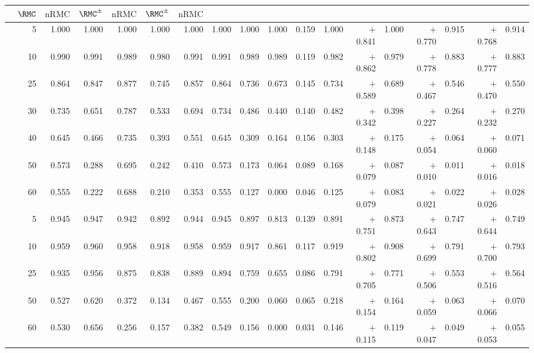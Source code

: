 \begin{table}[ht]
{\begin{tabular}{p{2.2cm}r rrrr rr rr rr rr rr rr}
  & $\RMC$ & $\mathrm{nRMC}$
  & $\RMC^{\pm}$ & $\mathrm{nRMC}$
  & $\RMC^{\pm}$ & $\mathrm{nRMC}$ \\
\midrule
{}
  & 5  & 1.000 & 1.000 & 1.000 & 1.000 & 1.000 & 1.000 & 1.000 & 1.000 & 0.159 & 1.000 & $+$0.841 & 1.000 & $+$0.770 & 0.915 & $+$0.768 & 0.914 \\
  & 10 & 0.990 & 0.991 & 0.989 & 0.980 & 0.991 & 0.991 & 0.989 & 0.989 & 0.119 & 0.982 & $+$0.862 & 0.979 & $+$0.778 & 0.883 & $+$0.777 & 0.883 \\
  & 25 & 0.864 & 0.847 & 0.877 & 0.745 & 0.857 & 0.864 & 0.736 & 0.673 & 0.145 & 0.734 & $+$0.589 & 0.689 & $+$0.467 & 0.546 & $+$0.470 & 0.550 \\
  & 30 & 0.735 & 0.651 & 0.787 & 0.533 & 0.694 & 0.734 & 0.486 & 0.440 & 0.140 & 0.482 & $+$0.342 & 0.398 & $+$0.227 & 0.264 & $+$0.232 & 0.270 \\
  & 40 & 0.645 & 0.466 & 0.735 & 0.393 & 0.551 & 0.645 & 0.309 & 0.164 & 0.156 & 0.303 & $+$0.148 & 0.175 & $+$0.054 & 0.064 & $+$0.060 & 0.071 \\
  & 50 & 0.573 & 0.288 & 0.695 & 0.242 & 0.410 & 0.573 & 0.173 & 0.064 & 0.089 & 0.168 & $+$0.079 & 0.087 & $+$0.010 & 0.011 & $+$0.016 & 0.018 \\
  & 60 & 0.555 & 0.222 & 0.688 & 0.210 & 0.353 & 0.555 & 0.127 & 0.000 & 0.046 & 0.125 & $+$0.079 & 0.083 & $+$0.021 & 0.022 & $+$0.026 & 0.028 \\
\midrule
{}
  & 5  & 0.945 & 0.947 & 0.942 & 0.892 & 0.944 & 0.945 & 0.897 & 0.813 & 0.139 & 0.891 & $+$0.751 & 0.873 & $+$0.643 & 0.747 & $+$0.644 & 0.749 \\
  & 10 & 0.959 & 0.960 & 0.958 & 0.918 & 0.958 & 0.959 & 0.917 & 0.861 & 0.117 & 0.919 & $+$0.802 & 0.908 & $+$0.699 & 0.791 & $+$0.700 & 0.793 \\
  & 25 & 0.935 & 0.956 & 0.875 & 0.838 & 0.889 & 0.894 & 0.759 & 0.655 & 0.086 & 0.791 & $+$0.705 & 0.771 & $+$0.506 & 0.553 & $+$0.516 & 0.564 \\
  & 50 & 0.527 & 0.620 & 0.372 & 0.134 & 0.467 & 0.555 & 0.200 & 0.060 & 0.065 & 0.218 & $+$0.154 & 0.164 & $+$0.059 & 0.063 & $+$0.066 & 0.070 \\
  & 60 & 0.530 & 0.656 & 0.256 & 0.157 & 0.382 & 0.549 & 0.156 & 0.000 & 0.031 & 0.146 & $+$0.115 & 0.119 & $+$0.047 & 0.049 & $+$0.053 & 0.055 \\

\end{tabular}}
\end{table}

